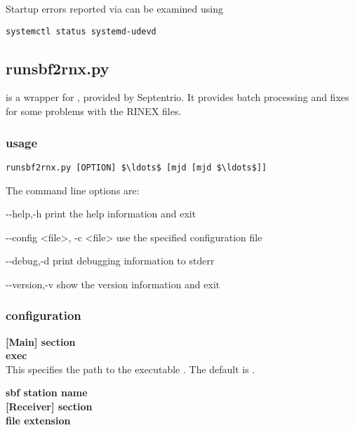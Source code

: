 Startup errors reported via  can be examined using
\begin{lstlisting}
systemctl status systemd-udevd
\end{lstlisting}

\subsection{runsbf2rnx.py}

 is a wrapper for , provided by Septentrio.
It provides batch processing and fixes for some problems with the RINEX files. 

\subsubsection{usage}

\begin{lstlisting}[mathescape=true]
runsbf2rnx.py [OPTION] $\ldots$ [mjd [mjd $\ldots$]]
\end{lstlisting}
The command line options are:
\begin{description*}
	\item[-{}-help,-h]	print the help information and exit
	\item[-{}-config \textless{file}\textgreater, -c \textless{file}\textgreater] use the specified configuration file 
	\item[-{}-debug,-d]	print debugging information to stderr
	\item[-{}-version,-v] show the version information and exit
\end{description*}

\subsubsection{configuration}

{\bfseries [Main] section}\\

{\bfseries exec}\\
This specifies the path to the executable .
The default is .

{\bfseries sbf station name}\\

{\bfseries [Receiver] section}\\

{\bfseries file extension}\\

